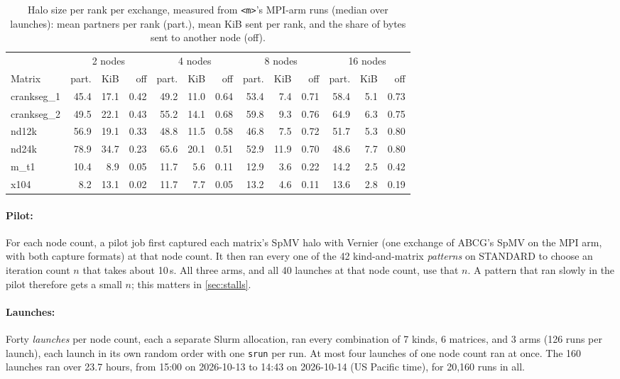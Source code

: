 \documentclass[11pt]{article}
\newcommand{\kM}{\texttt{<m>}}
\begin{document}
\begin{table}[t]
\centering
\small
\caption{Halo size per rank per exchange, measured from \kM's MPI-arm runs (median over
launches): mean partners per rank (part.), mean KiB sent per rank, and the share of bytes
sent to another node (off).}
\label{tab:matrices}
\setlength{\tabcolsep}{3.5pt}
\begin{tabular}{@{}lrrrrrrrrrrrr@{}}
\toprule
& \multicolumn{3}{c}{2 nodes} & \multicolumn{3}{c}{4 nodes} & \multicolumn{3}{c}{8 nodes} & \multicolumn{3}{c}{16 nodes} \\
\cmidrule(lr){2-4}\cmidrule(lr){5-7}\cmidrule(lr){8-10}\cmidrule(l){11-13}
Matrix & part. & KiB & off & part. & KiB & off & part. & KiB & off & part. & KiB & off \\
\midrule
crankseg\_1 & 45.4 & 17.1 & 0.42 & 49.2 & 11.0 & 0.64 & 53.4 & 7.4 & 0.71 & 58.4 & 5.1 & 0.73 \\
crankseg\_2 & 49.5 & 22.1 & 0.43 & 55.2 & 14.1 & 0.68 & 59.8 & 9.3 & 0.76 & 64.9 & 6.3 & 0.75 \\
nd12k & 56.9 & 19.1 & 0.33 & 48.8 & 11.5 & 0.58 & 46.8 & 7.5 & 0.72 & 51.7 & 5.3 & 0.80 \\
nd24k & 78.9 & 34.7 & 0.23 & 65.6 & 20.1 & 0.51 & 52.9 & 11.9 & 0.70 & 48.6 & 7.7 & 0.80 \\
m\_t1 & 10.4 & 8.9 & 0.05 & 11.7 & 5.6 & 0.11 & 12.9 & 3.6 & 0.22 & 14.2 & 2.5 & 0.42 \\
x104 & 8.2 & 13.1 & 0.02 & 11.7 & 7.7 & 0.05 & 13.2 & 4.6 & 0.11 & 13.6 & 2.8 & 0.19 \\
\bottomrule
\end{tabular}
\end{table}

\paragraph{Pilot:} For each node count, a pilot job first captured each matrix's SpMV halo
with Vernier (one exchange of ABCG's SpMV on the MPI arm, with both capture formats) at
that node count. It then ran every one of the 42 kind-and-matrix \emph{patterns} on
STANDARD to choose an iteration count $n$ that takes about 10\,s. All three arms, and all
40 launches at that node count, use that $n$. A pattern that ran slowly in the pilot
therefore gets a small $n$; this matters in \cref{sec:stalls}.

\paragraph{Launches:} Forty \emph{launches} per node count, each a separate Slurm
allocation, ran every combination of 7 kinds, 6 matrices, and 3 arms (126 runs per
launch), each launch in its own random order with one \texttt{srun} per run. At most four
launches of one node count ran at once. The 160 launches ran over 23.7 hours, from 15:00
on 2026-10-13 to 14:43 on 2026-10-14 (US Pacific time), for 20,160 runs in all.
\end{document}
